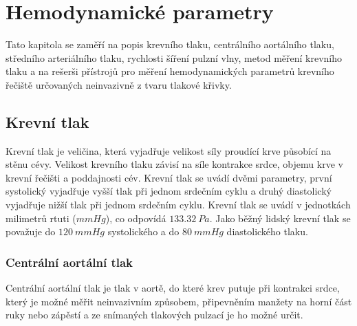 \chapter{Hemodynamické parametry}
Tato kapitola se zaměří na popis krevního tlaku, centrálního aortálního tlaku, středního arteriálního tlaku, rychlosti šíření pulzní vlny, metod měření krevního tlaku a na rešerši přístrojů pro měření hemodynamických parametrů krevního řečiště určovaných neinvazivně z tvaru tlakové křivky.
\section{Krevní tlak}
Krevní tlak je veličina, která vyjadřuje velikost síly proudící krve působící na stěnu cévy. Velikost krevního tlaku závisí na síle kontrakce srdce, objemu krve v krevní řečišti a
poddajnosti cév. Krevní tlak se uvádí dvěmi parametry, první systolický vyjadřuje vyšší tlak při jednom srdečním cyklu
a druhý diastolický vyjadřuje nižší tlak při jednom srdečním cyklu. Krevní tlak se uvádí v jednotkách milimetrů rtuti ($mmHg$), co odpovídá $133.32 \ Pa$. Jako běžný lidský krevní tlak se považuje do $120 \ mmHg$ systolického a do $80 \ mmHg$ diastolického tlaku.
\cite{cite:BP}

\subsection{Centrální aortální tlak}
Centrální aortální tlak je tlak v aortě, do které krev putuje při kontrakci srdce,
který je možné měřit neinvazivním způsobem, připevněním manžety na horní část ruky nebo zápěstí a ze snímaných tlakových pulzací je ho možné určit.\cite{cite:CBP}

